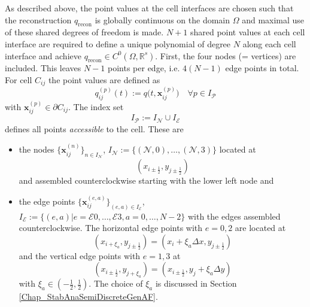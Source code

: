 \documentclass[12pt,a4paper]{article}
\begin{document}
As described above, the point values at the cell interfaces are chosen such that the reconstruction \(q_\mathrm{recon}\) is globally continuous on the domain \(\Omega\) and maximal use of these shared degrees of freedom is made. 
\(N+1\) shared point values at each cell interface are required to define a unique polynomial of degree $N$ along each cell interface and achieve \(q_\mathrm{recon} \in C^0(\Omega, \mathbb R^s)\). 
First, the four nodes (= vertices) are included. This leaves $N-1$ points per edge, i.e. \(4(N-1)\) edge points in total. 
For cell \(C_{ij}\) the point values are defined as 
\begin{equation}\label{Eq_GenAF2DarbPV}
	q_{ij}^{(p)}(t):= q\big(t, \mathbf x_{ij}^{(p)}\big) \quad \forall p \in I_{\mathcal P}
\end{equation}
with \(\mathbf x_{ij}^{(p)} \in \partial C_{ij}\). 
The index set 
\begin{equation}\label{Eq_IndexPointsAccCell}
	I_{\mathcal P} := I_{\mathcal N} \cup I_{\mathcal E}
\end{equation}
defines all points \emph{accessible} to the cell. These are 
\begin{itemize}
\item the nodes \(\big\{\mathbf x_{ij}^{(n)}\big\}_{n \in I_{\mathcal N}}\), \(I_{\mathcal N} := \{(\mathcal N,0),\dots, (\mathcal N,3)\}\) located at
\begin{equation*}
	(x_{i \pm \frac{1}{2}}, y_{j\pm \frac{1}{2}})
\end{equation*}
and assembled counterclockwise starting with the lower left node and 
\item the edge points \(\big\{\mathbf x_{ij}^{(e, a)}\big\}_{(e, a) \in I_{\mathcal E}}\), \(I_{\mathcal E} := \{(e,a) | e = \mathcal E0,\dots, \mathcal E3, a = 0,\dots, N-2\}\) with the edges assembled counterclockwise. The horizontal edge points with \(e = 0, 2\) are located at 
\begin{equation*}
	(x_{i +\xi_{a}},y_{j \pm \frac{1}{2}})=(x_i +\xi_{a} \Delta x,y_{j \pm \frac{1}{2}})
\end{equation*}
and the vertical edge points with \(e = 1, 3\) at 
\begin{equation*}
	(x_{i \pm \frac{1}{2}},y_{j +\xi_{a}}) = (x_{i \pm \frac{1}{2}},y_j  +\xi_{a} \Delta y)
\end{equation*}
with \(\xi_{a} \in (-\tfrac{1}{2}, \tfrac{1}{2})\). The choice of \(\xi_{a}\) is discussed in Section \ref{Chap_StabAnaSemiDiscreteGenAF}. 
\end{itemize}
\end{document}
